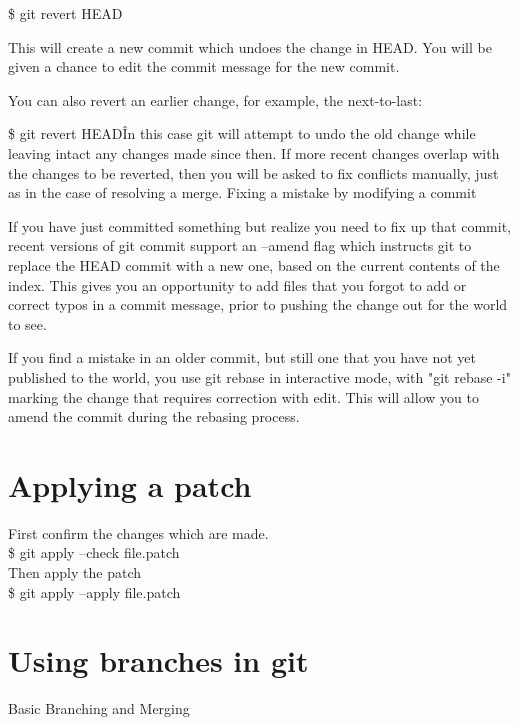 \documentclass[a4paper,10pt]{article}
\begin{document}
\$ git revert HEAD

This will create a new commit which undoes the change in HEAD. You will be given a chance to edit the commit message for the new commit.

You can also revert an earlier change, for example, the next-to-last:

\$ git revert HEAD\^
In this case git will attempt to undo the old change while leaving intact any changes made since then. If more recent changes overlap with the changes to be reverted, then you will be asked to fix conflicts manually, just as in the case of resolving a merge.
Fixing a mistake by modifying a commit

If you have just committed something but realize you need to fix up that commit, recent versions of git commit support an --amend flag which instructs git to replace the HEAD commit with a new one, based on the current contents of the index. This gives you an opportunity to add files that you forgot to add or correct typos in a commit message, prior to pushing the change out for the world to see.

If you find a mistake in an older commit, but still one that you have not yet published to the world, you use git rebase in interactive mode, with "git rebase -i" marking the change that requires correction with edit. This will allow you to amend the commit during the rebasing process.

\section{Applying a patch}
First confirm the changes which are made.\\
\$ git apply --check file.patch\\
Then apply the patch\\
\$ git apply --apply file.patch 

\section{Using branches in git}

Basic Branching and Merging
\end{document}
